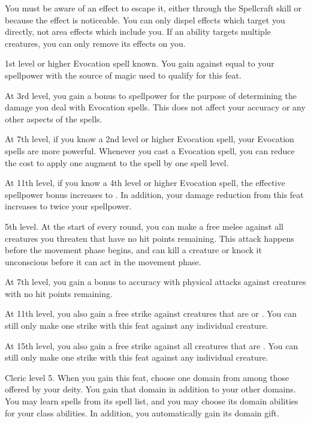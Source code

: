     You must be aware of an effect to escape it, either through the Spellcraft skill or because the effect is noticeable.
    You can only dispel effects which target you directly, not area effects which include you.
    If an ability targets multiple creatures, you can only remove its effects on you.

    \featpre 1st level or higher Evocation spell known.
    \featben You gain  against  equal to your spellpower with the source of magic used to qualify for this feat.

    At 3rd level, you gain a  bonus to spellpower for the purpose of determining the damage you deal with Evocation spells.
    This does not affect your accuracy or any other aspects of the spells.

    At 7th level, if you know a 2nd level or higher Evocation spell, your Evocation spells are more powerful.
    Whenever you cast a Evocation spell, you can reduce the cost to apply one augment to the spell by one spell level.

    At 11th level, if you know a 4th level or higher Evocation spell, the effective spellpower bonus increases to .
    In addition, your damage reduction from this feat increases to twice your spellpower.

    \featpres 5th level.
    \featben At the start of every round, you can make a free melee  against all creatures you threaten that have no hit points remaining.
    This attack happens before the movement phase begins, and can kill a creature or knock it unconscious before it can act in the movement phase.

    At 7th level, you gain a  bonus to accuracy with physical attacks against creatures with no hit points remaining.

    At 11th level, you also gain a free strike against creatures that are \helpless or \unaware.
    You can still only make one strike with this feat against any individual creature.

    At 15th level, you also gain a free strike against all creatures that are \bloodied.
    You can still only make one strike with this feat against any individual creature.

    \featpre Cleric level 5.
    \featben When you gain this feat, choose one domain from among those offered by your deity.
    You gain that domain in addition to your other domains.
    You may learn spells from its spell list, and you may choose its domain abilities for your class abilities.
    In addition, you automatically gain its domain gift.

